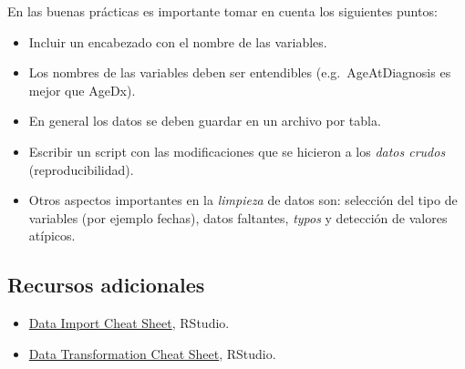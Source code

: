 \documentclass[
]{book}
\begin{document}
En las buenas prácticas es importante tomar en cuenta los siguientes puntos:

\begin{itemize}
\item
  Incluir un encabezado con el nombre de las variables.
\item
  Los nombres de las variables deben ser entendibles (e.g.~AgeAtDiagnosis es
  mejor que AgeDx).
\item
  En general los datos se deben guardar en un archivo por tabla.
\item
  Escribir un script con las modificaciones que se hicieron a los \emph{datos crudos}
  (reproducibilidad).
\item
  Otros aspectos importantes en la \emph{limpieza} de datos son: selección del tipo
  de variables (por ejemplo fechas), datos faltantes, \emph{typos} y detección de
  valores atípicos.
\end{itemize}

\hypertarget{recursos-adicionales}{%
\subsection*{Recursos adicionales}\label{recursos-adicionales}}

\begin{itemize}
\item
  \href{https://github.com/rstudio/cheatsheets/raw/master/data-import.pdf}{Data Import Cheat Sheet},
  RStudio.
\item
  \href{https://github.com/rstudio/cheatsheets/raw/master/data-transformation.pdf}{Data Transformation Cheat Sheet},
  RStudio.
\end{itemize}

  
\end{document}

